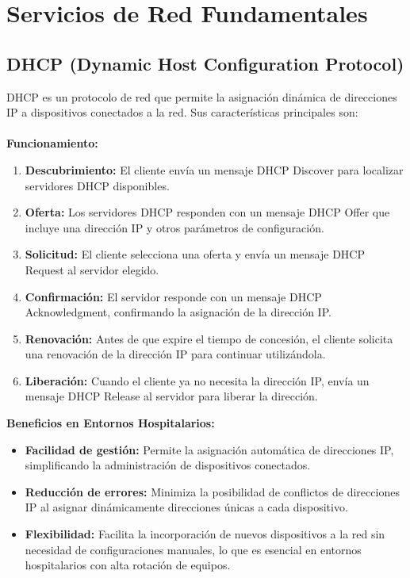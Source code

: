 \section{Servicios de Red Fundamentales}
\subsection{DHCP (Dynamic Host Configuration Protocol)}
\label{subsec:dhcp}
DHCP es un protocolo de red que permite la asignación dinámica de direcciones IP a dispositivos conectados a la red. Sus características principales son:
\\ \\
\textbf{Funcionamiento:}
\begin{enumerate}
    \item \textbf{Descubrimiento:} El cliente envía un mensaje DHCP Discover para localizar servidores DHCP disponibles.
    \item \textbf{Oferta:} Los servidores DHCP responden con un mensaje DHCP Offer que incluye una dirección IP y otros parámetros de configuración.
    \item \textbf{Solicitud:} El cliente selecciona una oferta y envía un mensaje DHCP Request al servidor elegido.
    \item \textbf{Confirmación:} El servidor responde con un mensaje DHCP Acknowledgment, confirmando la asignación de la dirección IP.
    \item \textbf{Renovación:} Antes de que expire el tiempo de concesión, el cliente solicita una renovación de la dirección IP para continuar utilizándola.
    \item \textbf{Liberación:} Cuando el cliente ya no necesita la dirección IP, envía un mensaje DHCP Release al servidor para liberar la dirección.
\end{enumerate}

\textbf{Beneficios en Entornos Hospitalarios:}
\begin{itemize}
    \item \textbf{Facilidad de gestión:} Permite la asignación automática de direcciones IP, simplificando la administración de dispositivos conectados.
    \item \textbf{Reducción de errores:} Minimiza la posibilidad de conflictos de direcciones IP al asignar dinámicamente direcciones únicas a cada dispositivo.
    \item \textbf{Flexibilidad:} Facilita la incorporación de nuevos dispositivos a la red sin necesidad de configuraciones manuales, lo que es esencial en entornos 
    hospitalarios con alta rotación de equipos.
\end{itemize}

